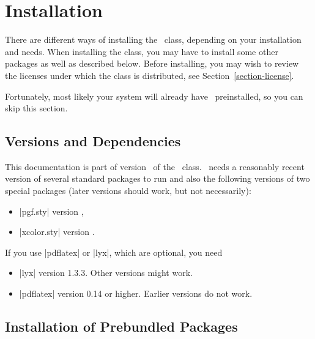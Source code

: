 %
%
%


\section{Installation}

\label{section-installation}

There are different ways of installing the \beamer\ class, depending
on your installation and needs. When installing the class, you may
have to install some other packages as well as described below. Before
installing, you may wish to review the licenses under
which the class is distributed, see Section~\ref{section-license}.

Fortunately, most likely your system will already have \beamer\
preinstalled, so you can skip this section.


\subsection{Versions and Dependencies}

This documentation is part of version \version\ of the \beamer\
class. \beamer\ needs a reasonably recent version of several standard
packages to run and also the following versions of two special
packages (later versions should work, but not necessarily):
\begin{itemize}
\item
  |pgf.sty| version \pgfversion,
\item
  |xcolor.sty| version \xcolorversion.
\end{itemize}

If you use |pdflatex| or |lyx|, which are optional, you need
\begin{itemize}
\item
  |lyx| version 1.3.3. Other versions might work.
\item
  |pdflatex| version 0.14 or higher. Earlier versions do not work.
\end{itemize}



\subsection{Installation of Prebundled Packages}

